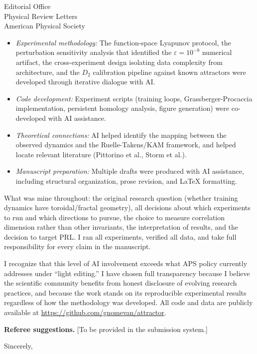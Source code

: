 \documentclass[11pt]{letter}
\begin{document}
\begin{letter}{%
Editorial Office\\
Physical Review Letters\\
American Physical Society}
\begin{itemize}
\item \textit{Experimental methodology:} The function-space Lyapunov protocol, the perturbation sensitivity analysis that identified the $\varepsilon = 10^{-8}$ numerical artifact, the cross-experiment design isolating data complexity from architecture, and the $D_2$ calibration pipeline against known attractors were developed through iterative dialogue with AI.
\item \textit{Code development:} Experiment scripts (training loops, Grassberger-Procaccia implementation, persistent homology analysis, figure generation) were co-developed with AI assistance.
\item \textit{Theoretical connections:} AI helped identify the mapping between the observed dynamics and the Ruelle-Takens/KAM framework, and helped locate relevant literature (Pittorino et al., Storm et al.).
\item \textit{Manuscript preparation:} Multiple drafts were produced with AI assistance, including structural organization, prose revision, and \LaTeX{} formatting.
\end{itemize}

What was mine throughout: the original research question (whether training dynamics have toroidal/fractal geometry), all decisions about which experiments to run and which directions to pursue, the choice to measure correlation dimension rather than other invariants, the interpretation of results, and the decision to target PRL. I ran all experiments, verified all data, and take full responsibility for every claim in the manuscript.

I recognize that this level of AI involvement exceeds what APS policy currently addresses under ``light editing.'' I have chosen full transparency because I believe the scientific community benefits from honest disclosure of evolving research practices, and because the work stands on its reproducible experimental results regardless of how the methodology was developed. All code and data are publicly available at \url{https://github.com/gnomevan/attractor}.

\textbf{Referee suggestions.} [To be provided in the submission system.]

\closing{Sincerely,}

\end{letter}
\end{document}
